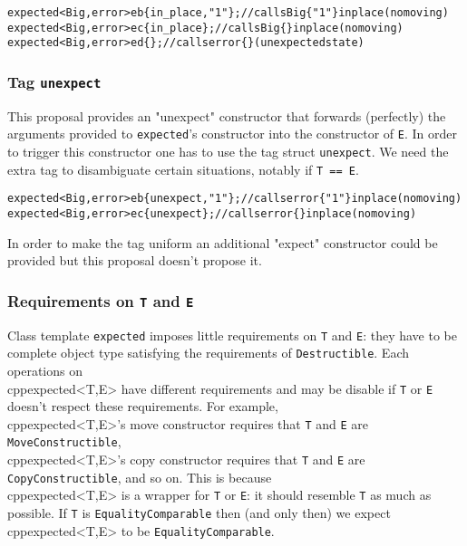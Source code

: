 \documentclass[a4paper,10pt]{article}
\newcommand{\cpp}[1]{\lstinline{#1}}
\begin{document}
\begin{alltt}
expected<Big, error> eb\{in_place, "1"\}; // calls Big\{"1"\} in place (no moving)
expected<Big, error> ec\{in_place\};      // calls Big\{\} in place (no moving)
expected<Big, error> ed\{\};              // calls error\{\} (unexpected state)
\end{alltt}


\subsubsection{Tag \cpp{unexpect}}

This proposal provides an "unexpect" constructor that forwards (perfectly) the arguments provided to \cpp{expected}'s constructor into the constructor of \cpp{E}. In order to trigger this constructor one has to use the tag struct \cpp{unexpect}. We need the extra tag to disambiguate certain situations, notably if \cpp{T == E}.

\begin{alltt}
expected<Big, error> eb\{unexpect, "1"\}; // calls error\{"1"\} in place (no moving)
expected<Big, error> ec\{unexpect\};      // calls error\{\} in place (no moving)
\end{alltt}

In order to make the tag uniform an additional "expect" constructor could be provided but this proposal doesn't propose it.

\subsubsection{Requirements on \cpp{T} and \cpp{E}}

Class template \cpp{expected} imposes little requirements on \cpp{T} and \cpp{E}: they have to be  complete object type satisfying the requirements of \cpp{Destructible}. Each operations on \\cpp{expected<T,E>} have different requirements and may be disable if \cpp{T} or \cpp{E} doesn't respect these requirements. For example, \\cpp{expected<T,E>}'s move constructor requires that \cpp{T} and \cpp{E} are \cpp{MoveConstructible}, \\cpp{expected<T,E>}'s copy constructor requires that \cpp{T} and \cpp{E} are \cpp{CopyConstructible}, and so on. This is because \\cpp{expected<T,E>} is a wrapper for \cpp{T} or \cpp{E}: it should resemble \cpp{T} as much as possible. If \cpp{T} is \cpp{EqualityComparable} then (and only then) we expect \\cpp{expected<T,E>} to be \cpp{EqualityComparable}. 
\end{document}
